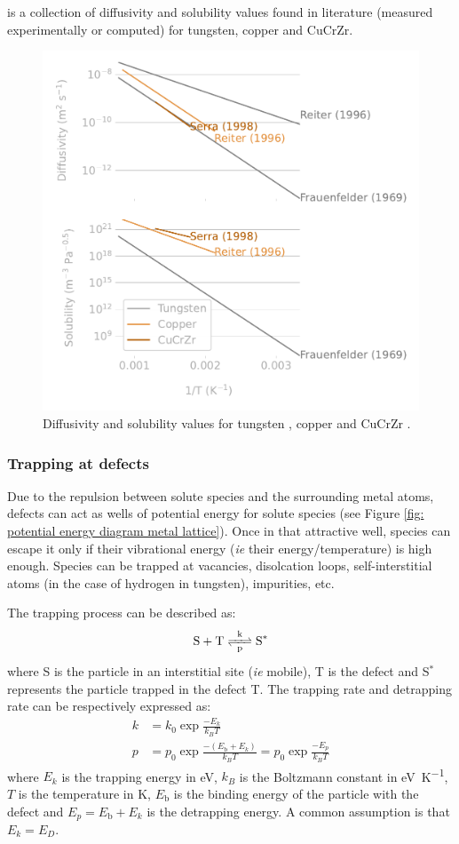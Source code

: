  is a collection of diffusivity and solubility values found in literature (measured experimentally or computed) for tungsten, copper and CuCrZr.

\begin{figure}
    \centering
    \includegraphics[width=0.75\linewidth]{Figures/Chapter1/diffusivity_solubility_materials.pdf}
    \caption{Diffusivity and solubility values for tungsten \cite{reiter_compilation_1996,frauenfelder_solution_1969}, copper \cite{reiter_compilation_1996} and CuCrZr \cite{serra_hydrogen_1998}.}
\end{figure}

\subsubsection{Trapping at defects}

Due to the repulsion between solute species and the surrounding metal atoms, defects can act as wells of potential energy for solute species (see Figure \ref{fig: potential energy diagram metal lattice}).
Once in that attractive well, species can escape it only if their vibrational energy (\textit{ie} their energy/temperature) is high enough.
Species can be trapped at vacancies, disolcation loops, self-interstitial atoms (in the case of hydrogen in tungsten), impurities, etc.

The trapping process can be described as:
\begin{equation}
    \ce{S + T <=>[k][p] S^*}
\end{equation}
where S is the particle in an interstitial site (\textit{ie} mobile), T is the defect and S$^*$ represents the particle trapped in the defect T.
The trapping rate and detrapping rate can be respectively expressed as:
\begin{align}
    k &= k_0 \exp{\frac{-E_k}{k_B T}} \\
    p &= p_0 \exp{\frac{-(E_\mathrm{b} + E_k)}{k_B T}} = p_0 \exp{\frac{-E_p}{k_B T}}
\end{align}
where $E_k$ is the trapping energy in \si{eV}, $k_B$ is the Boltzmann constant in \si{eV.K^{-1}}, $T$ is the temperature in \si{K}, $E_\mathrm{b}$ is the binding energy of the particle with the defect and $E_p = E_\mathrm{b} + E_k$ is the detrapping energy.
A common assumption is that $E_k = E_D$.

